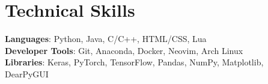 \documentclass[letterpaper,11pt]{article}
\begin{document}
%
\section{Technical Skills}
 \begin{itemize}[leftmargin=0.15in, label={}]
    \small{\item{
     \textbf{Languages}{: Python, Java, C/C++, HTML/CSS, Lua} \\
     \textbf{Developer Tools}{: Git, Anaconda, Docker, Neovim, Arch Linux} \\
     \textbf{Libraries}{: Keras, PyTorch, TensorFlow, Pandas, NumPy, Matplotlib, DearPyGUI}
    }}
 \end{itemize}


\end{document}

